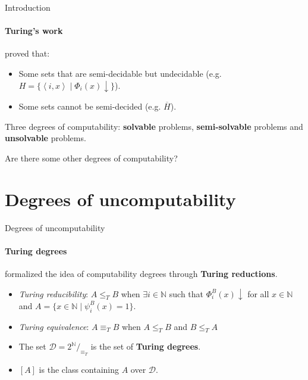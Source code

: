 \documentclass{beamer}
\newcommand{\N}{\mathbb{N}}
\newcommand{\abk}[1]{\left\langle#1\right\rangle}
\begin{document}
\begin{frame}{Introduction}
\framesubtitle{Turing's work}
    \textcite{turing} proved that:
    \begin{itemize}[<+->]
        \item  Some sets that are semi-decidable but undecidable (e.g. $H = \{\abk{i,x} \mid \Phi_i(x) \downarrow\}$).
        
        \item Some sets cannot be semi-decided (e.g. $\overline{H}$).
    \end{itemize}

    \quad

    \uncover<+-> {
        Three degrees of computability: \textbf{solvable} problems, \textbf{semi-solvable} problems and \textbf{unsolvable} problems.

        \quad

        Are there some other degrees of computability?
    }
\end{frame}

\section{Degrees of uncomputability}

\begin{frame}{Degrees of uncomputability}
\framesubtitle{Turing degrees}
    \textcite{post_degrees} formalized the idea of computability degrees through \textbf{Turing reductions}.

    \quad


    \begin{itemize}[<+->]
        \item \textit{Turing reducibility}: $A \leq_T B$ when $\exists i \in \N$ such that $\Phi_i^B(x) \downarrow$ for all $x \in \N$ and $A = \{x \in \N \mid \psi_i^B(x) = 1\}$.
        
        \item \textit{Turing equivalence}: $A \equiv_T B$ when $A \leq_T B$ and $B \leq_T A$
        
        \item The set $\mathcal{D} = 2^{\N}/_{\equiv_T}$ is the set of \textbf{Turing degrees}.
        \item $[A]$ is the class containing $A$ over $\mathcal{D}$.
    \end{itemize}
\end{frame}
\end{document}
